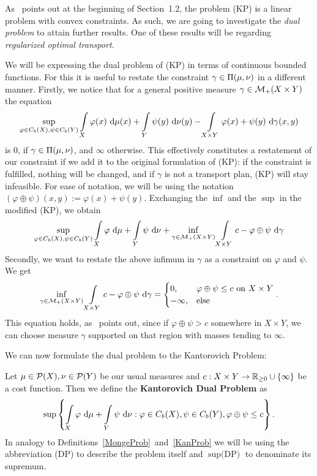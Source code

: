 As~\cite{San2015} points out at the beginning of Section~1.2, the problem (KP) is a linear problem with convex constraints. As such, we are going to investigate the \textit{dual problem} to attain further results. One of these results will be regarding \textit{regularized optimal transport}.


We will be expressing the dual problem of (KP) in terms of continuous bounded functions. For this it is useful to restate the constraint $\gamma \in \TP{\mu}{\nu}$ in a different manner. Firstly, we notice that for a general positive measure $\gamma \in \M[+]{X \times Y}$ the equation
\[ \sup\limits_{\varphi \in \CF[b]{X}, \psi \in \CF[b]{Y}} \int\limits_X \varphi(x)~\Dx{\mu} + \int\limits_Y \psi(y)~\Dx[y]{\nu} - \int\limits_{X \times Y} \varphi(x) + \psi(y)~\Dx[x, y]{\gamma} \]
is $0$, if $\gamma \in \TP{\mu}{\nu}$, and $\infty$ otherwise. This effectively constitutes a restatement of our constraint if we add it to the original formulation of (KP): if the constraint is fulfilled, nothing will be changed, and if $\gamma$ is not a transport plan, (KP) will stay infeasible. For ease of notation, we will be using the notation $(\varphi \oplus \psi)(x, y) := \varphi(x) + \psi(y)$. Exchanging the $\inf$ and the $\sup$ in the modified (KP), we obtain
\[ \sup\limits_{\varphi \in \CF[b]{X}, \psi \in \CF[b]{Y}} \int\limits_{X} \varphi~\D + \int\limits_{Y} \psi~\D[\nu] + \inf\limits_{\gamma \in \M[+]{X \times Y}} \int\limits_{X \times Y} c - \varphi \oplus \psi~\D[\gamma] \]
Secondly, we want to restate the above infimum in $\gamma$ as a constraint on $\varphi$ and $\psi$. We get
\[ \inf\limits_{\gamma \in \M[+]{X \times Y}} \int\limits_{X \times Y} c - \varphi \oplus \psi~\D[\gamma] = 
\begin{cases}
	0, & \varphi \oplus \psi \le c \text{ on } X \times Y \\
	- \infty, & \text{else}
\end{cases}. \]
This equation holds, as~\cite{San2015} points out, since if $\varphi \oplus \psi > c$ somewhere in $X \times Y$, we can choose measure $\gamma$ supported on that region with masses tending to $\infty$. 

We can now formulate the dual problem to the Kantorovich Problem:

\begin{definition}\label{DualProb}
	Let $\mu \in \PM{X}, \nu \in \PM{Y}$ be our usual measures and $\map[c]{X \times Y}{\RZero{} \cup{} \{ \infty \}}$ be a cost function. Then we define the \textbf{Kantorovich Dual Problem} as
	\begin{equation}\label{DPEq}
		\sup \left\{ \int\limits_{X} \varphi~\D + \int\limits_{Y} \psi~\D[\nu] : \varphi \in \CF[b]{X}, \psi \in \CF[b]{Y}, \varphi \oplus \psi \le c \right\}.
	\end{equation}
	In analogy to Definitions~\ref{MongeProb}~and~\ref{KanProb} we will be using the abbreviation (DP) to describe the problem itself and $\sup \text{(DP)}$ to denominate its supremum.
\end{definition}

